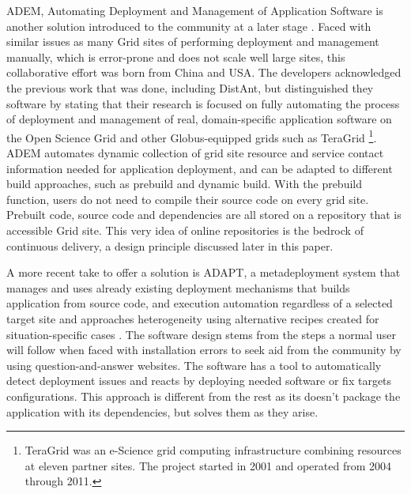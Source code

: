 \documentclass [titlepage,11pt]{article}
\begin{document}
ADEM, Automating Deployment and Management of Application Software is another solution introduced to the community at a later stage \citep{zheng09}. Faced with similar issues as many Grid sites of performing deployment and management manually, which is error-prone and does not scale well large sites, this collaborative effort was born from China and USA. The developers acknowledged the previous work that was done, including DistAnt, but distinguished they software by stating that their research is focused on fully automating the process of deployment and management of real, domain-specific application software on the Open Science Grid and other Globus-equipped grids such as TeraGrid \footnote{TeraGrid was an e-Science grid computing infrastructure combining resources at eleven partner sites. The project started in 2001 and operated from 2004 through 2011.}. \\

ADEM automates dynamic collection of grid site resource and service contact information needed for application deployment, and can be adapted to different build approaches, such as prebuild and dynamic build. With the prebuild function, users do not need to compile their source code on every grid site. Prebuilt code, source code and dependencies are all stored on a repository that is accessible Grid site. This very idea of online repositories is the bedrock of continuous delivery, a design principle discussed later in this paper. 

A more recent take to offer a solution is ADAPT, a metadeployment system that manages and uses already existing deployment mechanisms that builds application from source code, and execution automation regardless of a selected target site and approaches heterogeneity using alternative recipes created for situation-specific cases \citep{slawinski14}. The software design stems from the steps a normal user will follow when faced with installation errors to seek aid from the community by using question-and-answer websites. The software has a tool to automatically detect deployment issues and reacts by deploying needed software or fix targets configurations. This approach is different from the rest as its doesn't package the application with its dependencies, but solves them as they arise. \\
\end{document}
